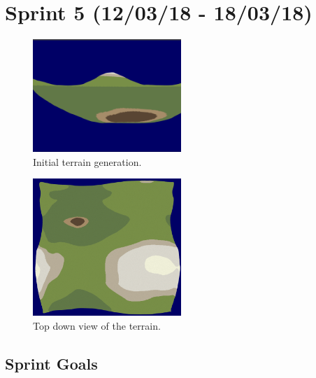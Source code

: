 \documentclass[a4paper,10pt]{report}
\begin{document}
\clearpage

\section{Sprint 5 (12/03/18 - 18/03/18)}

\begin{figure}[h!]
    \centering
  \includegraphics[width=0.5\textwidth]{Images/Sprint-Images/Sprint5-3.png}
  \caption{Initial terrain generation.}
  \label{fig:sprint5-3}
\end{figure}

\begin{figure}[h!]
    \centering
  \includegraphics[width=0.5\textwidth]{Images/Sprint-Images/Sprint5-6.png}
  \caption{Top down view of the terrain.}
  \label{fig:sprint5-6}
\end{figure}


\subsection{Sprint Goals}
\end{document}
